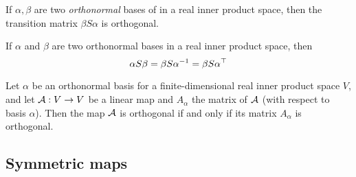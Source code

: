 \begin{theorem}
    If $\alpha, \beta$ are two \emph{orthonormal} bases of in a real inner product space, then the transition matrix $\beta S \alpha$ is orthogonal.
\end{theorem}

\begin{theorem}
    If $\alpha$ and $\beta$ are two orthonormal bases in a real inner product space, then
    $$\alpha S \beta = \beta S \alpha ^{-1} = \beta S \alpha ^\top$$
\end{theorem}

\begin{theorem}
    Let $\alpha$ be an orthonormal basis for a finite-dimensional real inner product space $V$, and 
    let $\mathcal{A} : V \to V$ be a linear map and $A_\alpha$ the matrix of $\mathcal{A}$ (with respect to basis $\alpha$).
    Then the map $\mathcal{A}$ is orthogonal if and only if its matrix $A_\alpha$ is orthogonal.
\end{theorem}

\subsection{Symmetric maps}
